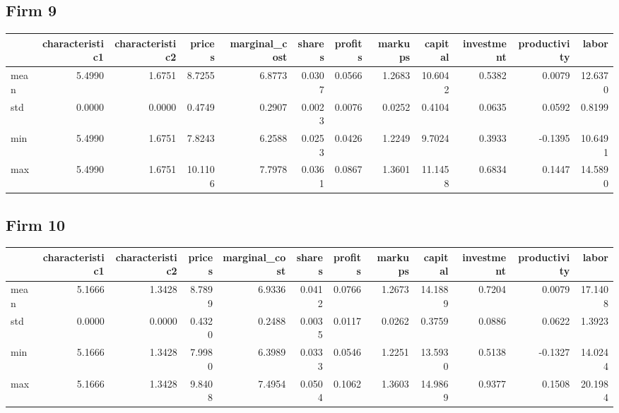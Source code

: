 \subsection*{Firm 9}
\begin{tabular}{lrrrrrrrrrrr}
\toprule
{} &  characteristic1 &  characteristic2 &  prices &  marginal\_cost &  shares &  profits &  markups &  capital &  investment &  productivity &   labor \\
\midrule
mean &           5.4990 &           1.6751 &  8.7255 &         6.8773 &  0.0307 &   0.0566 &   1.2683 &  10.6042 &      0.5382 &        0.0079 & 12.6370 \\
std  &           0.0000 &           0.0000 &  0.4749 &         0.2907 &  0.0023 &   0.0076 &   0.0252 &   0.4104 &      0.0635 &        0.0592 &  0.8199 \\
min  &           5.4990 &           1.6751 &  7.8243 &         6.2588 &  0.0253 &   0.0426 &   1.2249 &   9.7024 &      0.3933 &       -0.1395 & 10.6491 \\
max  &           5.4990 &           1.6751 & 10.1106 &         7.7978 &  0.0361 &   0.0867 &   1.3601 &  11.1458 &      0.6834 &        0.1447 & 14.5890 \\
\bottomrule
\end{tabular}


\subsection*{Firm 10}
\begin{tabular}{lrrrrrrrrrrr}
\toprule
{} &  characteristic1 &  characteristic2 &  prices &  marginal\_cost &  shares &  profits &  markups &  capital &  investment &  productivity &   labor \\
\midrule
mean &           5.1666 &           1.3428 &  8.7899 &         6.9336 &  0.0412 &   0.0766 &   1.2673 &  14.1889 &      0.7204 &        0.0079 & 17.1408 \\
std  &           0.0000 &           0.0000 &  0.4320 &         0.2488 &  0.0035 &   0.0117 &   0.0262 &   0.3759 &      0.0886 &        0.0622 &  1.3923 \\
min  &           5.1666 &           1.3428 &  7.9980 &         6.3989 &  0.0333 &   0.0546 &   1.2251 &  13.5930 &      0.5138 &       -0.1327 & 14.0244 \\
max  &           5.1666 &           1.3428 &  9.8408 &         7.4954 &  0.0504 &   0.1062 &   1.3603 &  14.9869 &      0.9377 &        0.1508 & 20.1984 \\
\bottomrule
\end{tabular}


